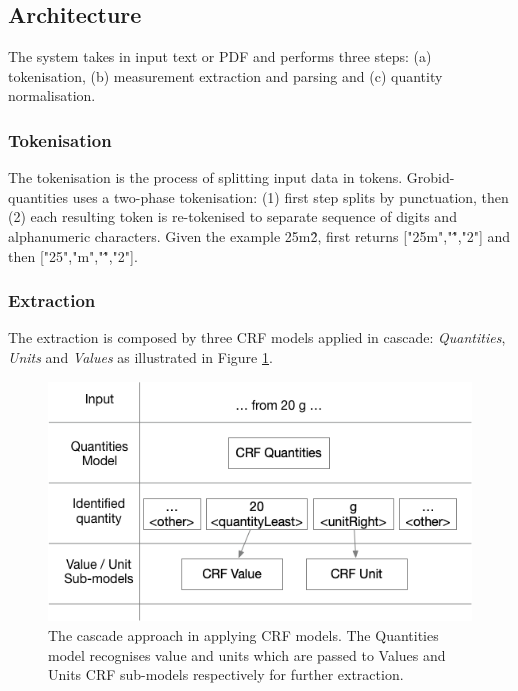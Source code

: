 \documentclass[sigconf]{acmart}
\begin{document}
\subsection{Architecture}
The system takes in input text or PDF and performs three steps: (a) tokenisation, (b) measurement extraction and parsing and (c) quantity normalisation. 

\subsubsection{Tokenisation}
The tokenisation is the process of splitting input data in tokens. Grobid-quantities uses a two-phase tokenisation: (1) first step splits by punctuation, then (2) each resulting token is re-tokenised to separate sequence of digits and alphanumeric characters. Given the example 25m\^2, first returns ["25m","\^","2"] and then ["25","m","\^","2"]. 

\subsubsection{Extraction}
The extraction is composed by three CRF models applied in cascade: \textit{Quantities}, \textit{Units} and \textit{Values} as illustrated in Figure \ref{fig:schema-cascade}.  

\begin{figure}[ht]
  \centering
  \includegraphics[width=\linewidth]{images/schema-cascade}
  \caption{The cascade approach in applying CRF models. The Quantities model recognises value and units which are  passed to Values and Units CRF sub-models respectively for further extraction.}
  \label{fig:schema-cascade}
\end{figure}
\end{document}
